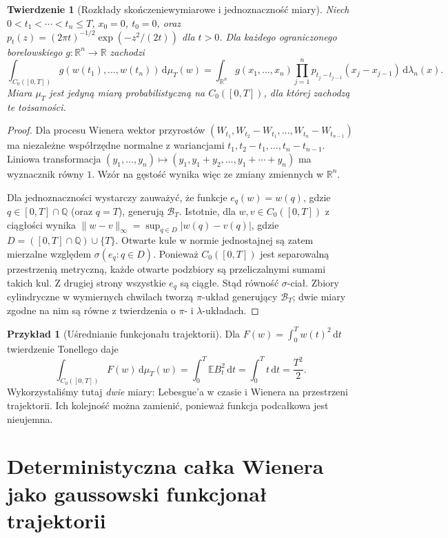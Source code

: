 \documentclass[11pt,a4paper,oneside]{report}
\numberwithin{equation}{chapter}
\theoremstyle{plain}
\newtheorem{twierdzenie}{Twierdzenie}[chapter]
\theoremstyle{definition}
\newtheorem{przyklad}{Przykład}[chapter]
\theoremstyle{remark}
\newcommand{\R}{\mathbb{R}}
\newcommand{\Q}{\mathbb{Q}}
\newcommand{\E}{\mathbb{E}}
\newcommand{\dd}{\mathrm{d}}
\begin{document}
\begin{twierdzenie}[Rozkłady skończeniewymiarowe i jednoznaczność miary]\label{thm:volIII:09:01}
\label{th:wiener-cyl}
Niech $0<t_1<\cdots<t_n\le T$, $x_0=0$, $t_0=0$, oraz
$p_t(z)=(2\pi t)^{-1/2}\exp(-z^2/(2t))$ dla $t>0$.
Dla każdego ograniczonego borelowskiego $g:\R^n\to\R$ zachodzi
\[
\int_{C_0([0,T])}g(w(t_1),\ldots,w(t_n))\,\dd\mu_T(w)
=\int_{\R^n}g(x_1,\ldots,x_n)
\prod_{j=1}^n p_{t_j-t_{j-1}}(x_j-x_{j-1})
\,\dd\lambda_n(x).
\]
Miara $\mu_T$ jest jedyną miarą probabilistyczną na
$C_0([0,T])$, dla której zachodzą te tożsamości.
\end{twierdzenie}
\begin{proof}
Dla procesu Wienera wektor przyrostów
$(W_{t_1},W_{t_2}-W_{t_1},\ldots,W_{t_n}-W_{t_{n-1}})$
ma niezależne współrzędne normalne z wariancjami
$t_1,t_2-t_1,\ldots,t_n-t_{n-1}$. Liniowa transformacja
$(y_1,\ldots,y_n)\mapsto(y_1,y_1+y_2,\ldots,y_1+\cdots+y_n)$
ma wyznacznik równy $1$. Wzór na gęstość wynika więc ze
zmiany zmiennych w $\R^n$.

Dla jednoznaczności wystarczy zauważyć, że funkcje
$e_q(w)=w(q)$, gdzie $q\in[0,T]\cap\Q$ (oraz $q=T$),
generują $\mathcal B_T$. Istotnie, dla $w,v\in C_0([0,T])$
z ciągłości wynika
$\|w-v\|_\infty=\sup_{q\in D}|w(q)-v(q)|$, gdzie
$D=([0,T]\cap\Q)\cup\{T\}$. Otwarte kule w normie
jednostajnej są zatem mierzalne względem
$\sigma(e_q:q\in D)$. Ponieważ $C_0([0,T])$ jest
separowalną przestrzenią metryczną, każde otwarte podzbiory
są przeliczalnymi sumami takich kul. Z drugiej strony
wszystkie $e_q$ są ciągłe. Stąd równość $\sigma$-ciał.
Zbiory cylindryczne w wymiernych chwilach tworzą
$\pi$-układ generujący $\mathcal B_T$; dwie miary
zgodne na nim są równe z twierdzenia o $\pi$- i $\lambda$-układach.
\end{proof}

\begin{przyklad}[Uśrednianie funkcjonału trajektorii]
Dla $F(w)=\int_0^T w(t)^2\,\dd t$ twierdzenie Tonellego daje
\[
\int_{C_0([0,T])} F(w)\,\dd\mu_T(w)
=\int_0^T\E B_t^2\,\dd t
=\int_0^Tt\,\dd t=\frac{T^2}{2}.
\]
Wykorzystaliśmy tutaj \emph{dwie} miary: Lebesgue'a w czasie i
Wienera na przestrzeni trajektorii. Ich kolejność można zamienić,
ponieważ funkcja podcałkowa jest nieujemna.
\end{przyklad}

\section{Deterministyczna całka Wienera jako gaussowski funkcjonał trajektorii}\label{sec:volIII:09:02}
\end{document}
